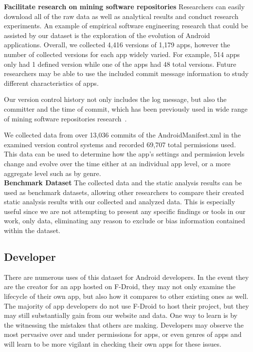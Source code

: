 \documentclass[journal,transmag]{IEEEtran}
\newcommand{\dan}[1]{\textcolor{blue}{{\it [Dan says: #1]}}}
\begin{document}
\textbf{Facilitate research on mining software repositories}
Researchers can easily download all of the raw data as well as analytical results and conduct research experiments. An example of empirical software engineering research that could be assisted by our dataset is the exploration of the evolution of Android applications. Overall, we collected 4,416 versions of 1,179 apps, however the number of collected versions for each app widely varied. For example, 514 apps only had 1 defined version while one of the apps had 48 total versions. Future researchers may be able to use the included commit message information to study different characteristics of apps.

Our version control history not only includes the log message, but also the committer and the time of commit, which has been previously used in wide range of mining software repositories research~\cite{Eyolfson:2011:TDD:1985441.1985464, bachmann2010missing, Buse:2010:ADP:1858996.1859005, Dallmeier:2007:EBL:1321631.1321702}.


We collected data from over 13,036 commits of the AndroidManifest.xml in the examined version control systems and recorded 69,707 total permissions used. This data can be used to determine how the app's settings and permission levels change and evolve over the time either at an individual app level, or a more aggregate level such as by genre.\\


%



\textbf{Benchmark Dataset}
The collected data and the static analysis results can be used as benchmark datasets, allowing other researchers to compare their created static analysis results with our collected and analyzed data. This is especially useful since we are not attempting to present any specific findings or tools in our work, only data, eliminating any reason to exclude or bias information contained within the dataset.


\subsection{Developer}

There are numerous uses of this dataset for Android developers. In the event they are the creator for an app hosted on F-Droid, they may not only examine the lifecycle of their own app, but also how it compares to other existing ones as well. The majority of app developers do not use F-Droid to host their project, but they may still substantially gain from our website and data. One way to learn is by the witnessing the mistakes that others are making. Developers may observe the most pervasive over and under permissions for apps, or even genres of apps and will learn to be more vigilant in checking their own apps for these issues. %
\end{document}
